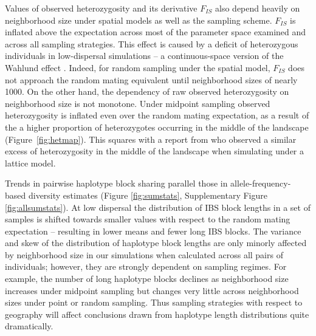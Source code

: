 \documentclass[11pt,twoside,lineno]{preprint}
\newif\ifcomments
\newcommand{\plr}[1]{\ifcomments{{\color{purple} \it (#1)}}\else{}\fi}
\begin{document}
Values of observed heterozygosity and its derivative $F_{IS}$ also depend heavily on neighborhood size under spatial models as well as the sampling scheme. 
$F_{IS}$ is inflated above the expectation across most of the parameter space examined and across all sampling strategies. 
This effect is caused by a deficit of heterozygous individuals in low-dispersal simulations 
-- a continuous-space version of the Wahlund effect \citep{Wahlund1928}. 
Indeed, for random sampling under the spatial model, $F_{IS}$ does not approach the random mating equivalent until neighborhood sizes of nearly 1000. 
On the other hand, the dependency of raw observed heterozygosity on neighborhood size is not monotone.
Under midpoint sampling observed heterozygosity is inflated even over the random mating expectation, 
as a result of the a higher proportion of heterozygotes occurring in the middle of the landscape (Figure~\ref{fig:hetmap}). 
This squares with a report from \cite{Shirk2014} who observed a similar excess of heterozygosity in the middle of the landscape when simulating under a lattice model.

\plr{peter to revisit this paragraph}
Trends in pairwise haplotype block sharing parallel those in allele-frequency-based diversity estimates (Figure \ref{fig:sumstats}, Supplementary Figure \ref{fig:allsumstats}). At low dispersal the distribution of IBS block lengths in a set of samples is shifted towards smaller values with respect to the random mating expectation -- resulting in lower means and fewer long IBS blocks. The variance and skew of the distribution of haplotype block lengths are only minorly affected by neighborhood size in our simulations when calculated across all pairs of individuals; however, they are strongly dependent on sampling regimes. For example, the number of long haplotype blocks declines as neighborhood size increases under midpoint sampling but changes very little across neighborhood sizes under point or random sampling. Thus sampling strategies with respect to geography will affect conclusions drawn from haplotype length distributions quite dramatically. 
\end{document}
